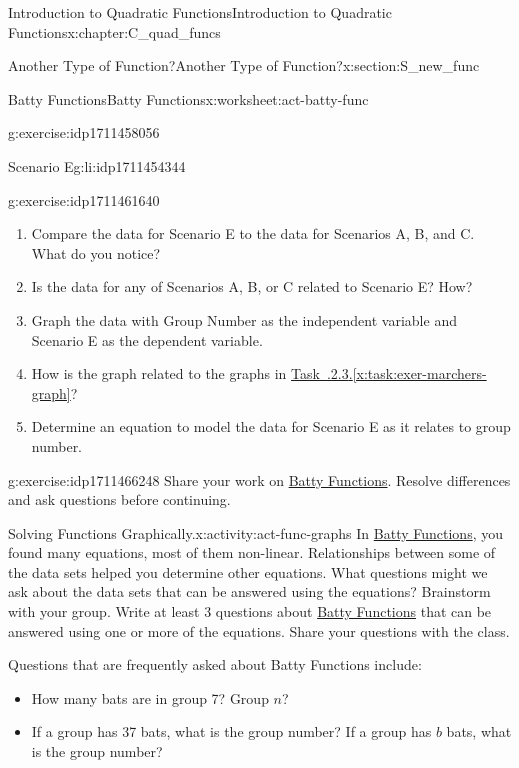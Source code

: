 \documentclass[oneside,10pt,]{book}
\newcommand{\xreffont}{\relax}
\numberwithin{equation}{chapter}
\begin{document}
\begin{chapterptx}{Introduction to Quadratic Functions}{}{Introduction to Quadratic Functions}{}{}{x:chapter:C_quad_funcs}
\begin{sectionptx}{Another Type of Function?}{}{Another Type of Function?}{}{}{x:section:S_new_func}
\begin{worksheet-subsection}{Batty Functions}{}{Batty Functions}{}{}{x:worksheet:act-batty-func}
\begin{divisionexercise}{5}{}{}{g:exercise:idp1711458056}
\begin{descriptionlist}
\begin{dlimedium}{Scenario E}{g:li:idp1711454344}
\end{dlimedium}%
\end{descriptionlist}
%
\end{divisionexercise}%
\begin{divisionexercise}{6}{}{}{g:exercise:idp1711461640}%
\begin{enumerate}[font=\bfseries,label=(\alph*),ref=\alph*]
\item{}Compare the data for Scenario E to the data for Scenarios A, B, and C. What do you notice?%
\item{}Is the data for any of Scenarios A, B, or C related to Scenario E? How?%
\item{}Graph the data with Group Number as the independent variable and Scenario E as the dependent variable.%
\item{}How is the graph related to the graphs in \hyperref[x:task:exer-marchers-graph]{Task~{\xreffont 4.1.2.3}.{\xreffont\ref{x:task:exer-marchers-graph}}}?%
\item{}Determine an equation to model the data for Scenario E as it relates to group number.%
\end{enumerate}
\end{divisionexercise}%
\begin{divisionexercise}{7}{}{}{g:exercise:idp1711466248}%
Share your work on \hyperref[x:worksheet:act-batty-func]{Batty Functions}. Resolve differences and ask questions before continuing.%
\end{divisionexercise}%
\end{worksheet-subsection}
\restoregeometry
\begin{activity}{Solving Functions Graphically.}{x:activity:act-func-graphs}%
In \hyperref[x:worksheet:act-batty-func]{Batty Functions}, you found many equations, most of them non-linear. Relationships between some of the data sets helped you determine other equations. What questions might we ask about the data sets that can be answered using the equations? Brainstorm with your group. Write at least 3 questions about \hyperref[x:worksheet:act-batty-func]{Batty Functions} that can be answered using one or more of the equations. Share your questions with the class.%
\par
Questions that are frequently asked about Batty Functions include:%
\begin{itemize}[label=\textbullet]
\item{}How many bats are in group 7? Group \(n\)?%
\item{}If a group has 37 bats, what is the group number? If a group has \(b\) bats, what is the group number?%

\end{itemize}
\end{activity}
\end{sectionptx}
\end{chapterptx}
\end{document}
